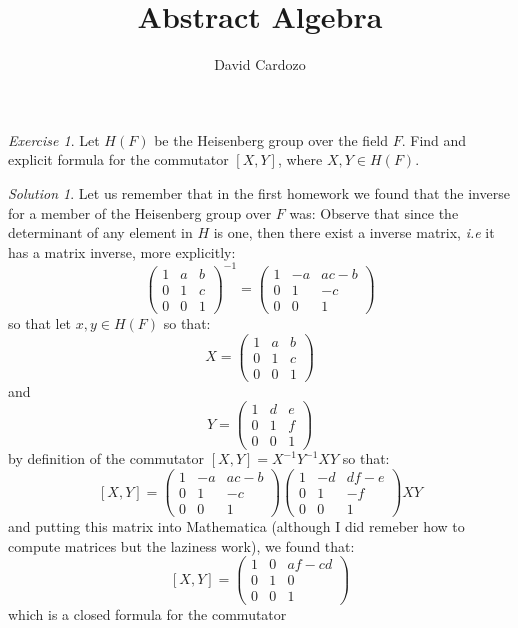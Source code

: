 \documentclass[notitlepage]{article}
\author{David Cardozo}
\title{ Abstract Algebra}
\theoremstyle{definition}
\theoremstyle{remark}
\newtheorem{exc}{Exercise}
\newtheorem*{sol}{Solution}
\newcommand{\inv}{^{-1}}
\begin{document}
\maketitle

\begin{exc}
	Let $ H(F) $ be the Heisenberg group over the field $ F $. Find and explicit formula for the commutator $ [X,Y] $, where $ X,Y \in H(F) $.
\end{exc}

\begin{sol}
	Let us remember that in the first homework we found that the inverse for a member of the Heisenberg group over $ F $ was:
	Observe that since the determinant of any element in $H$ is one, then there exist a inverse matrix, \emph{i.e} it has a matrix inverse, more explicitly:
	\[ 
	\begin{pmatrix}
	1&a&b  \\ 
	0&1&c \\    
	0&0&1
	\end{pmatrix}^{-1} =
	\begin{pmatrix}
	1 & -a & ac-b \\
	0 & 1 & -c \\
	0 & 0 & 1
	\end{pmatrix} \]
	so that let $ x,y \in H(F) $ so that:
	\[ X = \begin{pmatrix}
	1&a&b  \\ 
	0&1&c \\    
	0&0&1
	\end{pmatrix}  \]
	and 
	\[ Y = \begin{pmatrix}
	1&d&e  \\ 
	0&1&f \\    
	0&0&1
	\end{pmatrix}  \]
	by definition of the commutator $ [X,Y] = X\inv Y \inv XY $
	so that:
	\[ [X,Y]  = \begin{pmatrix}
	1&-a&ac - b  \\ 
	0&1&-c \\    
	0&0&1
	\end{pmatrix}
	 \begin{pmatrix}
		1&-d&df - e  \\ 
		0&1&-f \\    
		0&0&1
	\end{pmatrix} XY \]
	and putting this matrix into Mathematica (although I did remeber how to compute matrices but the laziness work), we found that:
	\[ [X,Y] = \begin{pmatrix}
	1&0&af-cd \\
	0&1&0 \\
	0&0&1
	\end{pmatrix} \]
	which is a closed formula for the commutator 
\end{sol}
\end{document}
